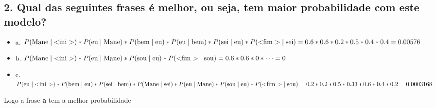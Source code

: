 \documentclass{article}
\begin{document}
\subsection*{2. Qual das seguintes frases é melhor, ou seja, tem maior probabilidade com este modelo?}
\begin{itemize}
    \item a. $P(\text{Mane} \mid \text{\textless ini \textgreater})*P(\text{eu} \mid \text{Mane})*P(\text{bem} \mid \text{eu})*P(\text{eu} \mid \text{bem})*P(\text{sei} \mid \text{eu})*P(\text{\textless fim \textgreater} \mid \text{sei}) = 0.6*0.6*0.2*0.5*0.4*0.4 = 0.00576$
    \item b. $P(\text{Mane} \mid \text{\textless ini \textgreater})*P(\text{eu} \mid \text{Mane})*P(\text{sou} \mid \text{eu})*P(\text{\textless fim \textgreater} \mid \text{sou}) = 0.6*0.6*0*\dots = 0$
    \item c. $P(\text{eu} \mid \text{\textless ini \textgreater})*P(\text{bem} \mid \text{eu})*P(\text{sei} \mid \text{bem})*P(\text{Mane} \mid \text{sei})*P(\text{eu} \mid \text{Mane})*P(\text{sou} \mid \text{eu})*P(\text{\textless fim \textgreater} \mid \text{sou}) = 0.2*0.2*0.5*0.33*0.6*0.4*0.2 = 0.0003168$
\end{itemize}
Logo a frase \textbf{a} tem a melhor probabilidade
\end{document}
